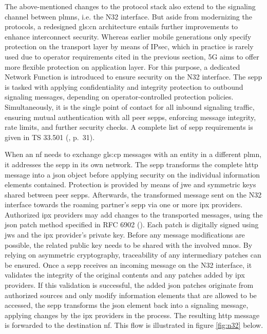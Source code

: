The above-mentioned changes to the protocol stack also extend to the signaling channel between \glspl{plmn}, i.e. the N32 interface.
But aside from modernizing the protocols, a redesigned \gls{gls:cn} architecture entails further improvements to enhance interconnect security.
Whereas earlier mobile generations only specify protection on the transport layer by means of IPsec, which in practice is rarely used due to operator requirements cited in the previous section, 5G aims to offer more flexible protection on application layer.
For this purpose, a dedicated Network Function is introduced to ensure security on the N32 interface.
The \gls{sepp} is tasked with applying confidentiality and integrity protection to outbound signaling messages, depending on operator-controlled protection policies.
Simultaneously, it is the single point of contact for all inbound signaling traffic, ensuring mutual authentication with all peer \glspl{sepp}, enforcing message integrity, rate limits, and further security checks.
A complete list of \gls{sepp} requirements is given in TS 33.501 (\cite{3gpp.33.501}, p.~31).

When an \gls{nf} needs to exchange \gls{gls:cp} messages with an entity in a different \gls{plmn}, it addresses the \gls{sepp} in its own network.
The \gls{sepp} transforms the complete \gls{http} message into a \gls{json} object before applying security on the individual information elements contained.
Protection is provided by means of \gls{jwe} and symmetric keys shared between peer \glspl{sepp}.
Afterwards, the transformed message sent on the N32 interface towards the roaming partner's \gls{sepp} via one or more \gls{ipx} providers.
Authorized \gls{ipx} providers may add changes to the transported messages, using the \gls{json} patch method specified in RFC 6902  (\cite{rfc6902}).
Each patch is digitally signed using \gls{jws} and the \gls{ipx} provider's private key.
Before any message modifications are possible, the related public key needs to be shared with the involved \glspl{mno}.
By relying on asymmetric cryptography, traceability of any intermediary patches can be ensured.
Once a \gls{sepp} receives an incoming message on the N32 interface, it validates the integrity of the original contents and any patches added by \gls{ipx} providers.
If this validation is successful, the added \gls{json} patches originate from authorized sources and only modify information elements that are allowed to be accessed, the \gls{sepp} transforms the \gls{json} element back into a signaling message, applying changes by the \gls{ipx} providers in the process.
The resulting \gls{http} message is forwarded to the destination \gls{nf}.
This flow is illustrated in figure \ref{fig:n32} below.

